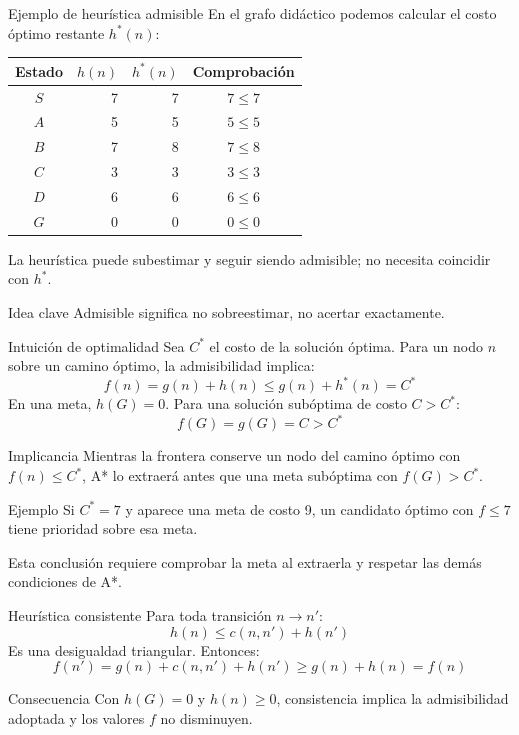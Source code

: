 \documentclass[aspectratio=169,11pt]{beamer}
\begin{document}
\begin{frame}{Ejemplo de heurística admisible}
  \small
  En el grafo didáctico podemos calcular el costo óptimo restante $h^*(n)$:
  \begin{table}
  \begin{tabular}{crrc}
    \toprule
    Estado & $h(n)$ & $h^*(n)$ & Comprobación \\\midrule
    $S$ & 7 & 7 & $7\leq7$ \\
    $A$ & 5 & 5 & $5\leq5$ \\
    $B$ & 7 & 8 & $7\leq8$ \\
    $C$ & 3 & 3 & $3\leq3$ \\
    $D$ & 6 & 6 & $6\leq6$ \\
    $G$ & 0 & 0 & $0\leq0$ \\
    \bottomrule
  \end{tabular}
  \end{table}
  La heurística puede subestimar y seguir siendo admisible; no necesita coincidir con $h^*$.
  \vfill
  \begin{block}{Idea clave}
    Admisible significa no sobreestimar, no acertar exactamente.
  \end{block}
\end{frame}

\begin{frame}{Intuición de optimalidad}
  \small
  Sea $C^*$ el costo de la solución óptima. Para un nodo $n$ sobre un camino óptimo, la admisibilidad implica:
  \[
    f(n)=g(n)+h(n)\leq g(n)+h^*(n)=C^*
  \]
  En una meta, $h(G)=0$. Para una solución subóptima de costo $C>C^*$:
  \[
    f(G)=g(G)=C>C^*
  \]
  \begin{block}{Implicancia}
    Mientras la frontera conserve un nodo del camino óptimo con $f(n)\leq C^*$, A* lo extraerá antes que una meta subóptima con $f(G)>C^*$.
  \end{block}
  \begin{exampleblock}{Ejemplo}
    Si $C^*=7$ y aparece una meta de costo 9, un candidato óptimo con $f\leq7$ tiene prioridad sobre esa meta.
  \end{exampleblock}
  \scriptsize Esta conclusión requiere comprobar la meta al extraerla y respetar las demás condiciones de A*.
\end{frame}

\begin{frame}{Heurística consistente}
  Para toda transición $n\rightarrow n'$:
  \[
    \boxed{h(n)\leq c(n,n')+h(n')}
  \]
  Es una desigualdad triangular. Entonces:
  \[
    f(n')=g(n)+c(n,n')+h(n')\geq g(n)+h(n)=f(n)
  \]
  \begin{block}{Consecuencia}
    Con $h(G)=0$ y $h(n)\geq0$, consistencia implica la admisibilidad adoptada y los valores $f$ no disminuyen.
  \end{block}
\end{frame}
\end{document}
